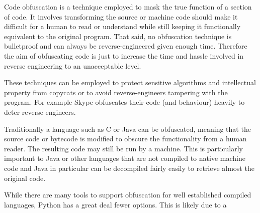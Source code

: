 \documentclass{report}
\begin{document}
Code obfuscation is a technique employed to mask the true function
of a section of code. It involves transforming the source or machine
code should make it difficult for a human to read or understand
while still keeping it functionally equivalent to the original
program. That said, no obfuscation technique is bulletproof and can
always be reverse-engineered given enough time. Therefore the aim of
obfuscating code is just to increase the time and hassle involved in
reverse engineering to an unacceptable level.

These techniques can be employed to protect sensitive algorithms and
intellectual property from copycats or to avoid reverse-engineers
tampering with the program. For example Skype obfuscates their code
(and behaviour) heavily to deter reverse engineers.


Traditionally a language such as C or Java can be obfuscated,
meaning that the source code or bytecode is modified to obscure the
functionality from a human reader. The resulting code may still be
run by a machine. This is particularly important to Java or other
languages that are not compiled to native machine code and Java in
particular can be decompiled fairly easily to retrieve almost the
original code.

While there are many tools to support obfuscation for well
established compiled languages, Python has a great deal fewer
options. This is likely due to a
\end{document}
